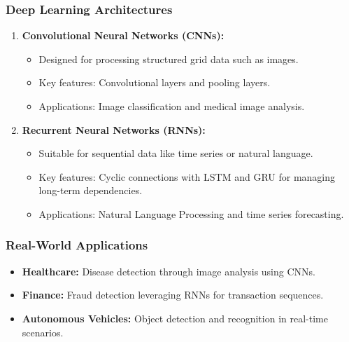 \documentclass[aspectratio=169]{beamer}
\begin{document}
\begin{frame}[fragile]
    \frametitle{Deep Learning Architectures}
    \begin{enumerate}
        \item \textbf{Convolutional Neural Networks (CNNs):}
            \begin{itemize}
                \item Designed for processing structured grid data such as images.
                \item Key features: Convolutional layers and pooling layers.
                \item Applications: Image classification and medical image analysis.
            \end{itemize}
        \item \textbf{Recurrent Neural Networks (RNNs):}
            \begin{itemize}
                \item Suitable for sequential data like time series or natural language.
                \item Key features: Cyclic connections with LSTM and GRU for managing long-term dependencies.
                \item Applications: Natural Language Processing and time series forecasting.
            \end{itemize}
    \end{enumerate}
\end{frame}

\begin{frame}[fragile]
    \frametitle{Real-World Applications}
    \begin{itemize}
        \item \textbf{Healthcare:} Disease detection through image analysis using CNNs.
        \item \textbf{Finance:} Fraud detection leveraging RNNs for transaction sequences.
        \item \textbf{Autonomous Vehicles:} Object detection and recognition in real-time scenarios.
    \end{itemize}
\end{frame}
\end{document}
